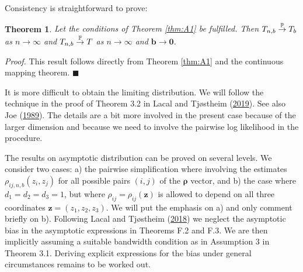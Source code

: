 \documentclass[
  12pt,
  letterpaper]{article}
\newtheorem{thm}{Theorem}[section]
\numberwithin{equation}{section}
\newcommand{\z}{\bm{z}}
\newcommand{\frho}{\bm{\rho}}
\newcommand{\bb}{\bm{b}}
\begin{document}
Consistency is straightforward to prove:

\begin{thm}
Let the conditions of Theorem \ref{thm:A1} be fulfilled. Then $T_{n,b} \buildrel {\mathbb{P}} \over {\to} T_b$ as $n \to \infty$ and $T_{n,b} \buildrel {\mathbb{P}} \over {\to} T$ as $n \to \infty$ and $\bb \to \bm{0}$.
\label{thm:F1}
\end{thm}

\emph{Proof.} This result follows directly from Theorem \ref{thm:A1} and the continuous mapping theorem. \(\blacksquare\)

It is more difficult to obtain the limiting distribution. We will follow the technique in the proof of Theorem 3.2 in Lacal and Tjøstheim (\protect\hyperlink{ref-lacal2018estimating}{2019}). See also Joe (\protect\hyperlink{ref-joe1989estimation}{1989}). The details are a bit more involved in the present case because of the larger dimension and because we need to involve the pairwise log likelihood in the procedure.

The results on asymptotic distribution can be proved on several levels. We consider two cases: a) the pairwise simplification where involving the estimates \(\rho_{ij,n,b}(z_i,z_j)\) for all possible pairs \((i,j)\) of the \(\frho\) vector, and b) the case where \(d_1=d_2=d_3=1\), but where \(\rho_{ij} = \rho_{ij}(\z)\) is allowed to depend on all three coordinates \(\z=(z_1,z_2,z_3)\). We will put the emphasis on a) and only comment briefly on b). Following Lacal and Tjøstheim (\protect\hyperlink{ref-lacal2018estimating}{2018}) we neglect the asymptotic bias in the asymptotic expressions in Theorems F.2 and F.3. We are then implicitly assuming a suitable bandwidth condition as in Assumption 3 in Theorem 3.1. Deriving explicit expressions for the bias under general circumstances remains to be worked out.
\end{document}
